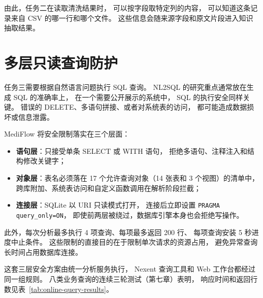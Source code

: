 由此，任务二在读取清洗结果时，
可以按字段取特定列的内容，
可以知道这条记录来自 CSV 的哪一行和哪个文件。
这些信息会随来源字段和原文片段进入知识抽取结果。

\section{多层只读查询防护}

任务三需要根据自然语言问题执行 SQL 查询。
NL2SQL 的研究重点通常放在生成 SQL 的准确率上，
在一个需要公开展示的系统中，
SQL 的执行安全同样关键。
错误的 DELETE、多语句拼接、或者对系统表的访问，
都可能造成数据损坏或信息泄露。

MediFlow 将安全限制落实在三个层面：

\begin{itemize}
  \item \textbf{语句层}：只接受单条 SELECT 或 WITH 语句，
        拒绝多语句、注释注入和结构修改关键字；
  \item \textbf{对象层}：表名必须落在 17 个允许查询对象（14 张表和 3 个视图）的清单中，
        跨库附加、系统表访问和自定义函数调用在解析阶段拦截；
  \item \textbf{连接层}：SQLite 以 URI 只读模式打开，
        连接后立即设置 \texttt{PRAGMA query\_only=ON}，
        即使前两层被绕过，数据库引擎本身也会拒绝写操作。
\end{itemize}

此外，每次分析最多执行 4 项查询、每项最多返回 200 行、
每项查询安装 5 秒进度中止条件。
这些限制的直接目的在于限制单次请求的资源占用，
避免异常查询长时间占用数据库连接。

这套三层安全方案由统一分析服务执行，
Nexent 查询工具和 Web 工作台都经过同一组规则。
八类业务查询的连续三轮测试（第七章）表明，
响应时间和返回行数见表~\ref{tab:online-query-results}。
